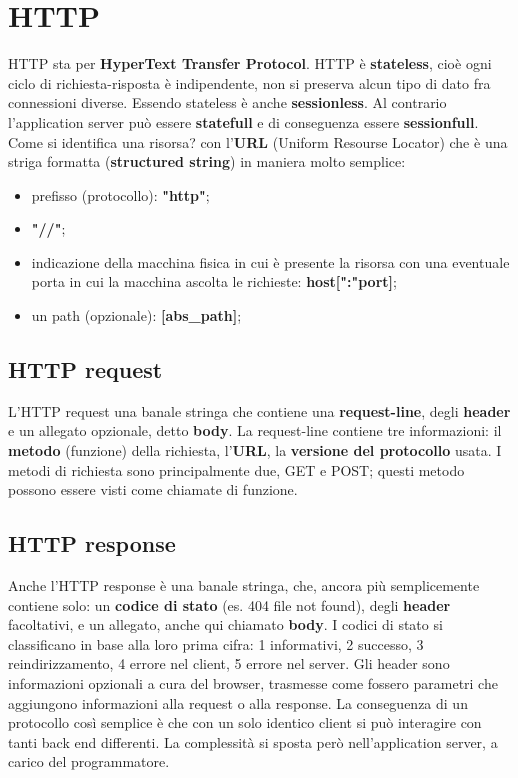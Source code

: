 \section{HTTP}
HTTP sta per \textbf{HyperText Transfer Protocol}.\newline
\newline
HTTP è \textbf{stateless}, cioè ogni ciclo di richiesta-risposta è indipendente, non si preserva alcun tipo di dato fra connessioni diverse. Essendo stateless è anche \textbf{sessionless}.\newline
Al contrario l'application server può essere \textbf{statefull} e di conseguenza essere \textbf{sessionfull}.\newline
\newline
Come si identifica una risorsa? con l'\textbf{URL} (Uniform Resourse Locator) che è una striga formatta (\textbf{structured string}) in maniera molto semplice:
\begin{itemize}
    \item prefisso (protocollo): \textbf{"http"};
    \item \textbf{"//"};
    \item indicazione della macchina fisica in cui è presente la risorsa con una eventuale porta in cui la macchina ascolta le richieste: \textbf{host[":"port]};
    \item un path (opzionale): \textbf{[abs\_path]};
\end{itemize}
\subsection{HTTP request} 
L'HTTP request una banale stringa che contiene una \textbf{request-line}, degli \textbf{header} e un allegato opzionale, detto \textbf{body}.\newline
La request-line contiene tre informazioni: il \textbf{metodo} (funzione) della richiesta, l'\textbf{URL}, la \textbf{versione del protocollo} usata. I metodi di richiesta sono principalmente due, GET e POST; questi metodo possono essere visti come chiamate di funzione.
\subsection{HTTP response} 
Anche l'HTTP response è una banale stringa, che, ancora più semplicemente contiene solo: un \textbf{codice di stato} (es. 404 file not found), degli \textbf{header} facoltativi, e un allegato, anche qui chiamato \textbf{body}.\newline
I codici di stato si classificano in base alla loro prima cifra: 1 informativi, 2 successo, 3 reindirizzamento, 4 errore nel client, 5 errore nel server.\newline
\newline
Gli header sono informazioni opzionali a cura del browser, trasmesse come fossero parametri che aggiungono informazioni alla request o alla response.\newline
\newline
La conseguenza di un protocollo così semplice è che con un solo identico client si può interagire con tanti back end differenti. La complessità si sposta però nell'application server, a carico del programmatore.
\newpage
